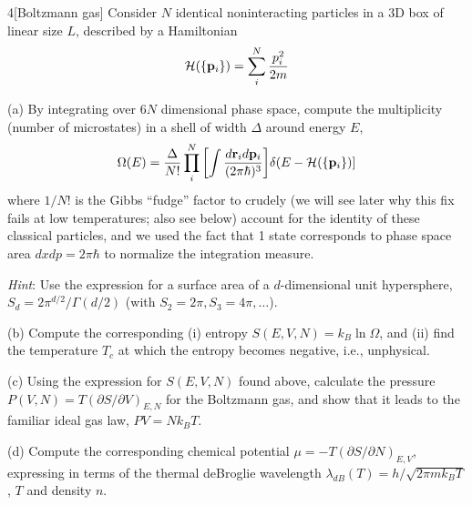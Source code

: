 \documentclass[12pt]{article}
\begin{document}
\newpage
\begin{problem}{4}[Boltzmann gas]
Consider $N$ identical noninteracting particles in a 3D box of linear size $L$,
described by a Hamiltonian
\begin{equation}
    \mathcal{H}(\qty{\vb{p}_i})=\sum_i^N\frac{p_i^2}{2m}
\end{equation}

(a) By integrating over $6N$ dimensional phase space, compute the multiplicity
(number of microstates) in a shell of width $\Delta$ around energy $E$,
\begin{equation}
    \Omega(E)=\frac{\Delta}{N!}\prod_{i}^N\qty[\int\frac{d\vb{r}_id\vb{p}_i}{(2\pi\hbar)^3}]\delta(E-\mathcal{H}(\qty{\vb{p}_i})] 
\end{equation}
where $1/N!$ is the Gibbs ``fudge'' factor to crudely (we will see later why
this fix fails at low temperatures; also see below) account for the identity of
these classical particles, and we used the fact that 1 state corresponds to
phase space area $dxdp=2\pi\hbar$ to normalize the integration measure.

\textit{Hint}: Use the expression for a surface area of a $d$-dimensional unit
hypersphere, $S_d=2\pi^{d/2}/\Gamma(d/2)$ (with $S_2=2\pi,S_3=4\pi,\hdots$).

(b) Compute the corresponding (i) entropy $S(E,V,N)=k_B\ln\Omega$, and (ii) find
the temperature $T_c$ at which the entropy becomes negative, i.e., unphysical.

(c) Using the expression for $S(E,V,N)$ found above, calculate the pressure
$P(V,N)=T(\partial S/\partial V)_{E,N}$ for the Boltzmann gas, and show that it
leads to the familiar ideal gas law, $PV=Nk_BT$.

(d) Compute the corresponding chemical potential $\mu=-T(\partial S/\partial
N)_{E,V}$, expressing in terms of the thermal deBroglie wavelength
$\lambda_{dB}(T)=h/\sqrt{2\pi mk_BT}$, $T$ and density $n$.
\begin{solution}


\end{solution}
\end{problem}
\end{document}
